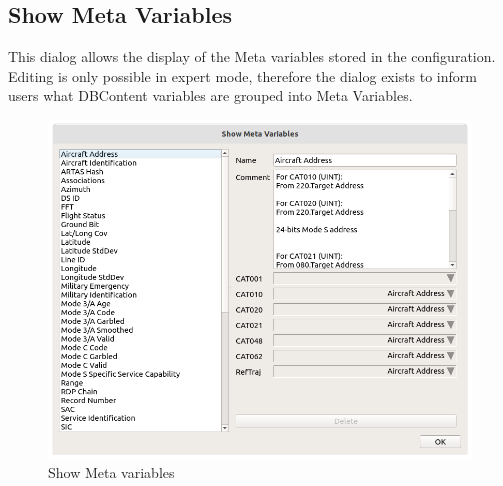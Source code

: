 \subsection{Show Meta Variables}
\label{sec:configure_meta_vars}

This dialog allows the display of the Meta variables stored in the configuration. Editing is only possible in expert mode, therefore the dialog exists to inform users what DBContent variables are grouped into Meta Variables. \\

\begin{figure}[H]
  \center
    \hspace*{-0.5cm}
    \includegraphics[width=15cm]{figures/configure_meta_vars.png}
  \caption{Show Meta variables}
\end{figure}
